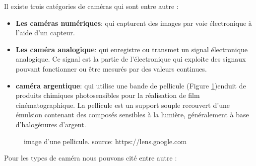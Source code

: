  Il existe trois catégories de caméras qui sont entre autre \cite{noauthor_camera_2024}:
 \begin{itemize}
 	\item \textbf{Les caméras numériques}: qui capturent des images par voie électronique à l’aide d’un capteur.
 	
 	\item \textbf{Les caméra analogique}: qui enregistre ou transmet un signal électronique analogique. 
 	Ce signal est la partie de l'électronique qui exploite des signaux pouvant fonctionner ou être mesurés par des valeurs continues. 
 	
 	\item\textbf{caméra argentique}: qui utilise une bande de pellicule (Figure \ref{fig:Pellicule})enduit de produits chimiques photosensibles pour la réalisation de film cinématographique.
 	La pellicule est un support souple recouvert d'une émulsion contenant des composés sensibles à la lumière, généralement à base d'halogénures d'argent.
 	
 \end{itemize}
 
 \begin{figure}[H]%
 	\center%
 	\setlength{\fboxsep}{5pt}%
 	\setlength{\fboxrule}{0.5pt}%
 	\caption[Pellicule]{image d'une pellicule. source: https://lens.google.com}
 	\label{fig:Pellicule}
 \end{figure}
 
 
 Pour les types de caméra nous pouvons cité entre autre \cite{noauthor_les_2015} :
 
